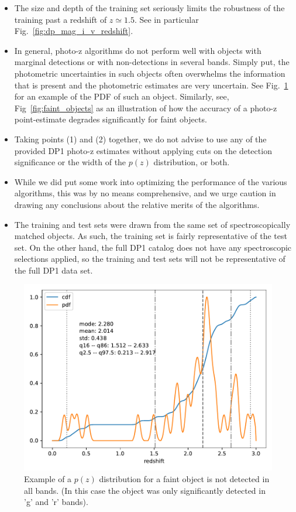 \begin{itemize}
\item{The size and depth of the training set seriously limits the robustness of the training past a redshift of $z \simeq 1.5$.  See in particular Fig.~\ref{fig:dp_mag_i_v_redshift}.}
\item{In general, photo-z algorithms do not perform well with objects with marginal detections or with non-detections in several bands.  Simply put, the photometric uncertainties in such objects often overwhelms the information that is present and the photometric estimates are very uncertain.  See Fig.~\ref{fig:faint_object_pdf} for an example of the PDF of such an object.   Similarly, see, Fig~\ref{fig:faint_objects} as an illustration of how the accuracy of a photo-z point-estimate degrades significantly for faint objects.}
\item{Taking points (1) and (2) together, we do not advise to use any of the provided DP1 photo-z estimates without applying cuts on the detection significance or the width of the $p(z)$ distribution, or both.}
\item{While we did put some work into optimizing the performance of the various algorithms, this was by no means comprehensive, and we urge caution in drawing any conclusions about the relative merits of the algorithms.}
\item{The training and test sets were drawn from the same set of spectroscopically matched objects.  As such, the training set is fairly representative of the test set.   On the other hand, the full DP1 catalog does not have any spectroscopic selections applied, so the training and test sets will not be representative of the full DP1 data set.}
\end{itemize}

\begin{figure}
    \centering
    \includegraphics[width=0.45\linewidth]{figures/bad_pdf.pdf}
    \caption{Example of a $p(z)$ distribution for a faint object is not detected in all bands.  (In this case the object was only significantly detected in 'g' and 'r' bands).}
    \label{fig:faint_object_pdf}
\end{figure}

